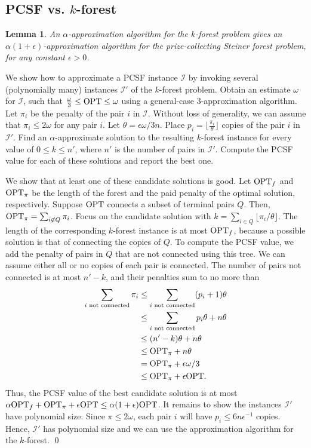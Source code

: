\documentclass[extras,11pt]{article} \usepackage{fullpage}
\theoremstyle{mytheorem}
\newtheorem{lemma}[theorem]{Lemma}
\renewenvironment{proof}{\par\noindent{\bf Proof.}\hspace{0.5em}}
    {\hfill\qed\vspace{1ex}}
\newcommand{\eps}{\epsilon}
\newcommand{\prob}[1]{\textit{#1}}
\newcommand{\I}{\mathcal{I}}
\newcommand{\OPT}{\mbox{\rm OPT}}
\begin{document}
\subsection{PCSF vs. $k$-forest}
\begin{lemma}\label{lem:kfor>pcsf}
 An $\alpha$-approximation algorithm for the \prob{$k$-forest} problem
 gives an $\alpha(1+\eps)$-approximation algorithm for the \prob{prize-collecting Steiner forest} problem, for any constant $\eps > 0$.
\end{lemma}
\begin{proof}
 We show how to approximate a PCSF instance $\I$ by
 invoking several (polynomially many) instances $\I'$ of the $k$-forest problem.
 Obtain an estimate $\omega$ for  $\I$,
 such that $\frac{\omega}{3} \leq \OPT \leq \omega$ using a general-case $3$-approximation algorithm.
 Let $\pi_i$ be the penalty of the pair $i$ in $\I$.
 Without loss of generality, we can assume that $\pi_i \leq 2\omega$ for any pair $i$.
Let $\theta = \eps\omega/3n$.
 Place $p_i=\lfloor \frac{\pi_i}{\theta} \rfloor$ copies  of  the pair $i$ in $\I'$. Find an $\alpha$-approximate solution to the resulting $k$-forest instance
 for every value of $0\leq k\leq n'$, where $n'$ is the number of pairs in $\I'$.
 Compute the PCSF value for each of these solutions and report the best one.

 We show that at least one of these candidate solutions is good.
 Let $\OPT_f$ and $\OPT_\pi$ be the length of the forest and the paid penalty
 of the optimal solution, respectively.
 Suppose $\OPT$ connects a subset of terminal pairs $Q$.
 Then, $\OPT_\pi = \sum_{i\not\in Q}\pi_i$.
 Focus on the candidate solution with $k = \sum_{i\in Q}\lfloor\pi_i/\theta\rfloor$.
 The length of the corresponding $k$-forest instance is
 at most $\OPT_f$, because a possible solution is that of connecting the copies of  $Q$.
 To compute the PCSF value, we add the penalty of pairs in $Q$ that are not connected using this tree.
 We can assume either all or no copies of each pair is connected.
 The number of pairs not connected is at most $n' - k$,
 and  their penalties sum to no more than
\begin{align*}
      \sum_{i\text{ not connected}} \pi_i
&\leq  \sum_{i\text{ not connected}} (p_i+1)\theta \\
&\leq  \sum_{i\text{ not connected}} p_i\theta + n\theta \\
&\leq  (n'-k)\theta + n\theta \\
&\leq  \OPT_\pi + n\theta \\
&=     \OPT_\pi + \eps\omega/3 \\
&\leq  \OPT_\pi + \eps\OPT.
\end{align*}
Thus, the PCSF value of the best candidate solution is at most $\alpha\OPT_f+\OPT_\pi+\eps\OPT\leq\alpha(1+\eps)\OPT$.
 It remains to show the instances $\I'$ have polynomial size.
 Since $\pi \leq 2\omega$, each pair $i$ will have $p_i \leq 6n\eps^{-1}$ copies.
 Hence, $\I'$ has polynomial size and we can use the approximation algorithm for the $k$-forest.
\end{proof}
\end{document}
